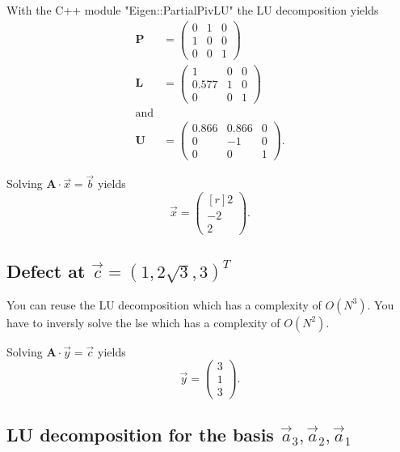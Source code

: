 With the C++ module "Eigen::PartialPivLU" the LU decomposition yields
\begin{align}
    \symbf{P} &= 
    \begin{pmatrix}
        0 & 1 & 0 \\
        1 & 0 & 0 \\
        0 & 0 & 1 
    \end{pmatrix} \\
    \symbf{L} &= 
    \begin{pmatrix}
        1 & 0 & 0 \\
        0.577 & 1 & 0 \\
        0 & 0 & 1 
    \end{pmatrix} \\ \text{and} \\
    \symbf{U} &= 
    \begin{pmatrix}
        0.866 & 0.866 & 0 \\
        0 & -1 & 0 \\
        0 & 0 & 1 
    \end{pmatrix} .
\end{align}

Solving $\symbf{A} \cdot \vec{x} = \vec{b}$ yields 
\begin{equation}
    \vec{x} = 
    \begin{pmatrix*}[r]
        2 \\ -2 \\ 2
    \end{pmatrix*} .
\end{equation}

\subsection{Defect at $\vec{c} = (1,2\sqrt{3},3)^T$}

You can reuse the LU decomposition which has a complexity of $O(N^3)$.
You have to inversly solve the lse which has a complexity of $O(N^2)$.

Solving $\symbf{A} \cdot \vec{y} = \vec{c}$ yields
\begin{equation}
    \vec{y} = 
    \begin{pmatrix}
        3 \\ 1 \\ 3
    \end{pmatrix} .
\end{equation}

\subsection{LU decomposition for the basis ${\vec{a}_3,\vec{a}_2,\vec{a}_1}$}

